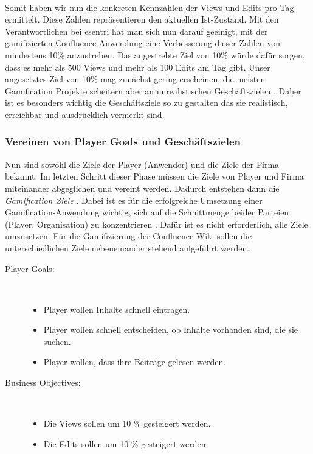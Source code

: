 \documentclass[a4paper,12pt,twoside]{scrartcl}
\begin{document}
\\
Somit haben wir nun die konkreten Kennzahlen der Views und Edits pro Tag ermittelt. Diese Zahlen repräsentieren den aktuellen Ist-Zustand. Mit den Verantwortlichen bei esentri hat man sich nun darauf geeinigt, mit der gamifizierten Confluence Anwendung eine Verbesserung dieser Zahlen von mindestens 10\% anzustreben. Das angestrebte Ziel von 10\% würde dafür sorgen, dass es mehr als 500 Views und mehr als 100 Edits am Tag gibt. Unser angesetztes Ziel von 10\% mag zunächst gering erscheinen, die meisten Gamification Projekte scheitern aber an unrealistischen Geschäftszielen \cite{gamificationDefinition}. Daher ist es besonders wichtig die Geschäftsziele so zu gestalten das sie realistisch, erreichbar und ausdrücklich vermerkt sind.

\subsubsection{Vereinen von Player Goals und Geschäftszielen}
\label{Gamification Ziele}
Nun sind sowohl die Ziele der Player (Anwender) und die Ziele der Firma bekannt. Im letzten Schritt dieser Phase müssen die Ziele von Player und Firma miteinander abgeglichen und vereint werden. Dadurch entstehen dann die \textit{Gamification Ziele} \cite{gamificationDefinition}. Dabei ist es für die erfolgreiche Umsetzung einer Gamification-Anwendung wichtig, sich auf die Schnittmenge beider Parteien (Player, Organisation) zu konzentrieren \cite{gamificationDefinition}. Dafür ist es nicht erforderlich, alle Ziele umzusetzen. Für die Gamifizierung der Confluence Wiki sollen die unterschiedlichen Ziele nebeneinander stehend aufgeführt werden.
\begin{description}
   \item[Player Goals:]~\par
   \begin{itemize}
      \item Player wollen Inhalte schnell eintragen. 
      \item Player wollen schnell entscheiden, ob Inhalte vorhanden sind, die sie suchen.
      \item Player wollen, dass ihre Beiträge gelesen werden.
   \end{itemize}
\end{description} 
\begin{description}
   \item[Business Objectives:]~\par
   \begin{itemize}
      \item Die Views sollen um 10 \% gesteigert werden. 
      \item Die Edits sollen um 10 \% gesteigert werden.
   \end{itemize}
\end{description}
\end{document}
